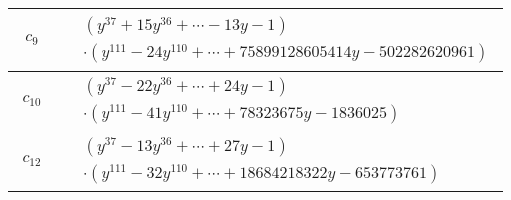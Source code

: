 \documentclass[1p]{elsarticle_modified}
\theoremstyle{definition}
\begin{document}
\begin{tabular}{m{50pt}|m{274pt}}
\hline $$\begin{aligned}c_{9}\end{aligned}$$&$\begin{aligned}
&(y^{37}+15 y^{36}+\cdots-13 y-1)\\
&\cdot(y^{111}-24 y^{110}+\cdots+75899128605414 y-502282620961)
\end{aligned}$\\
\hline $$\begin{aligned}c_{10}\end{aligned}$$&$\begin{aligned}
&(y^{37}-22 y^{36}+\cdots+24 y-1)\\
&\cdot(y^{111}-41 y^{110}+\cdots+78323675 y-1836025)
\end{aligned}$\\
\hline $$\begin{aligned}c_{12}\end{aligned}$$&$\begin{aligned}
&(y^{37}-13 y^{36}+\cdots+27 y-1)\\
&\cdot(y^{111}-32 y^{110}+\cdots+18684218322 y-653773761)
\end{aligned}$\\
\hline
\end{tabular}
\vskip 2pc
\end{document}
